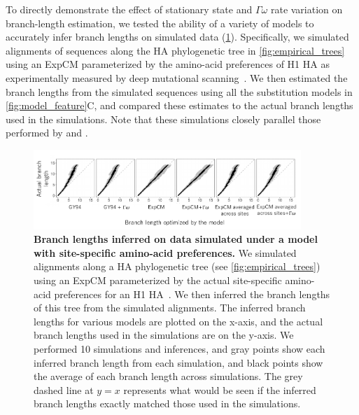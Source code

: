 \documentclass[11pt]{article}
\begin{document}
To directly demonstrate the effect of stationary state and $\Gamma\omega$ rate variation on branch-length estimation, we tested the ability of a variety of models to accurately infer branch lengths on simulated data (\ref{fig:simulations}).
Specifically, we simulated alignments of sequences along the HA phylogenetic tree in \ref{fig:empirical_trees} using an ExpCM parameterized by the amino-acid preferences of H1 HA as experimentally measured by deep mutational scanning~\citep{doud2016accurate}. We then estimated the branch lengths from the simulated sequences using all the substitution models in \ref{fig:model_feature}C, and compared these estimates to the actual branch lengths used in the simulations.
Note that these simulations closely parallel those performed by \citet{halpern1998evolutionary} and \citet{wertheim2011purifying}.

\begin{figure}
\centerline{\includegraphics[width=0.9\textwidth]{figures/simulations}}
\caption{\label{fig:simulations}
\textbf{Branch lengths inferred on data simulated under a model with site-specific amino-acid preferences.} 
We simulated alignments along a HA phylogenetic tree (see \ref{fig:empirical_trees}) using an ExpCM parameterized by the actual site-specific amino-acid preferences for an H1 HA~\citep{doud2016accurate}.
We then inferred the branch lengths of this tree from the simulated alignments.
The inferred branch lengths for various models are plotted on the x-axis, and the actual branch lengths used in the simulations are on the y-axis.
We performed 10 simulations and inferences, and gray points show each inferred branch length from each simulation, and black points show the average of each branch length across simulations.
The grey dashed line at $y=x$ represents what would be seen if the inferred branch lengths exactly matched those used in the simulations. 
}
\end{figure}
\end{document}
